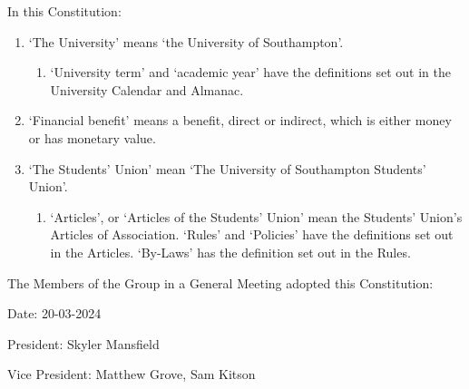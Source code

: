 \documentclass[12pt]{constitution}
\begin{document}
In this Constitution:
\begin{enumerate}
    \item `The University' means `the University of Southampton'.
    \begin{enumerate}
        \item `University term' and `academic year' have the definitions set out in the University Calendar and Almanac.
    \end{enumerate}

    \item `Financial benefit' means a benefit, direct or indirect, which is either money or has monetary value.
    \item `The Students' Union' mean `The University of Southampton Students' Union'.
    \begin{enumerate}
        \item `Articles', or `Articles of the Students' Union' mean the Students' Union's Articles of Association. `Rules' and `Policies' have the definitions set out in the Articles. `By-Laws' has the definition set out in the Rules.
    \end{enumerate}
\end{enumerate}


\label{clause:declaration}

The Members of the Group in a General Meeting adopted this Constitution:

Date: 20-03-2024

President: Skyler Mansfield

Vice President: Matthew Grove, Sam Kitson
\end{document}
